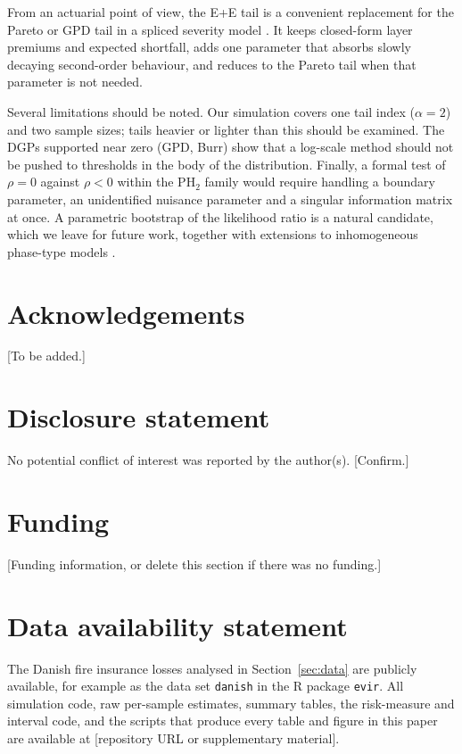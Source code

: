 \documentclass[12pt]{article}
\theoremstyle{definition}
\theoremstyle{remark}
\newcommand{\todo}[1]{{\color{red}[#1]}}
\begin{document}
From an actuarial point of view, the E+E tail is a convenient replacement for the Pareto or GPD tail in a spliced severity model \citep{Reynkens2017}. It keeps closed-form layer premiums and expected shortfall, adds one parameter that absorbs slowly decaying second-order behaviour, and reduces to the Pareto tail when that parameter is not needed.

Several limitations should be noted. Our simulation covers one tail index ($\alpha=2$) and two sample sizes; tails heavier or lighter than this should be examined. The DGPs supported near zero (GPD, Burr) show that a log-scale method should not be pushed to thresholds in the body of the distribution. Finally, a formal test of $\rho=0$ against $\rho<0$ within the PH$_2$ family would require handling a boundary parameter, an unidentified nuisance parameter and a singular information matrix at once. A parametric bootstrap of the likelihood ratio is a natural candidate, which we leave for future work, together with extensions to inhomogeneous phase-type models \citep{AlbrecherBladt2019}.

\section*{Acknowledgements}
\todo{To be added.}

\section*{Disclosure statement}
No potential conflict of interest was reported by the author(s). \todo{Confirm.}

\section*{Funding}
\todo{Funding information, or delete this section if there was no funding.}

\section*{Data availability statement}\label{sec:availability}
The Danish fire insurance losses analysed in Section~\ref{sec:data} are publicly available, for example as the data set \texttt{danish} in the R package \texttt{evir}. All simulation code, raw per-sample estimates, summary tables, the risk-measure and interval code, and the scripts that produce every table and figure in this paper are available at \todo{repository URL or supplementary material}.
\end{document}
